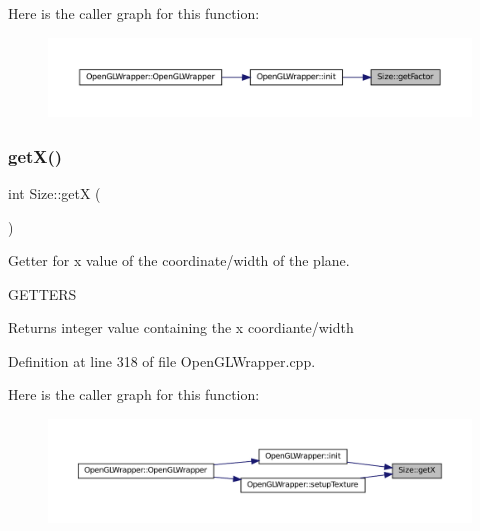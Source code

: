 Here is the caller graph for this function\+:\nopagebreak
\begin{figure}[H]
\begin{center}
\leavevmode
\includegraphics[width=350pt]{classSize_a1f0f20fa0d81274342165fce2355ab63_icgraph}
\end{center}
\end{figure}
\mbox{\label{classSize_ae9a207666c19954cae4b41174e1bb93d}} 
\subsubsection{\texorpdfstring{getX()}{getX()}}
{\footnotesize\ttfamily int Size\+::getX (\begin{DoxyParamCaption}{ }\end{DoxyParamCaption})}



Getter for x value of the coordinate/width of the plane. 

G\+E\+T\+T\+E\+RS\begin{DoxyReturn}{Returns}
integer value containing the x coordiante/width 
\end{DoxyReturn}


Definition at line 318 of file Open\+G\+L\+Wrapper.\+cpp.

Here is the caller graph for this function\+:\nopagebreak
\begin{figure}[H]
\begin{center}
\leavevmode
\includegraphics[width=350pt]{classSize_ae9a207666c19954cae4b41174e1bb93d_icgraph}
\end{center}
\end{figure}
\mbox{\label{classSize_aea85ae41eda5b85e61b72b3f9b1b4799}} 

